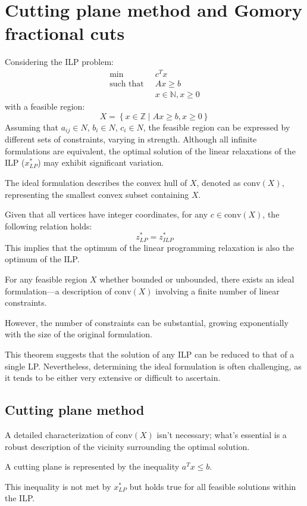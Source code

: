 \section{Cutting plane method and Gomory fractional cuts}

Considering the ILP problem:
\begin{align*}
    \min                      \:&\: c^T x                       \\
    \text{such that }     &\: Ax \geq b                   \\
                                &\: x \in \mathbb{N}, x \geq 0
\end{align*}
with a feasible region:
\[ X = \left\{ x \in \mathbb{Z} \mid Ax \geq b,x \geq 0 \right\} \]
Assuming that $a_{ij} \in N$, $b_i \in N$, $c_i \in N$, the feasible region can be expressed by different sets of constraints, varying in strength. 
Although all infinite formulations are equivalent, the optimal solution of the linear relaxations of the ILP ($x^{\ast}_{LP}$) may exhibit significant variation.
\begin{definition}
    The ideal formulation describes the convex hull of $X$, denoted as $\text{conv}(X)$, representing the smallest convex subset containing $X$. 
\end{definition}
Given that all vertices have integer coordinates, for any $c \in \text{conv}(X)$, the following relation holds:
\[ z^{\ast}_{LP} = z^{\ast}_{ILP} \]
This implies that the optimum of the linear programming relaxation is also the optimum of the ILP.
\begin{theorem}
    For any feasible region $X$ whether bounded or unbounded, there exists an ideal formulation—a description of $\text{conv}(X)$ involving a finite number of linear constraints.
\end{theorem}
However, the number of constraints can be substantial, growing exponentially with the size of the original formulation.

This theorem suggests that the solution of any ILP can be reduced to that of a single LP. 
Nevertheless, determining the ideal formulation is often challenging, as it tends to be either very extensive or difficult to ascertain.

\subsection{Cutting plane method}
A detailed characterization of $\text{conv}(X)$ isn't necessary; what's essential is a robust description of the vicinity surrounding the optimal solution.
\begin{definition}
    A cutting plane is represented by the inequality $a^T x \leq b$.
\end{definition}
This inequality is not met by $x^{\ast}_{LP}$ but holds true for all feasible solutions within the ILP.

